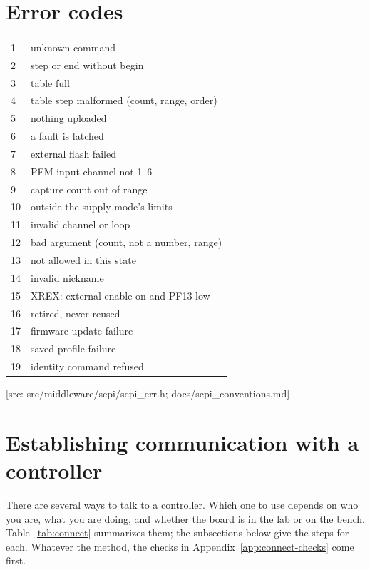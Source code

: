 \documentclass[11pt]{article}
\newcommand{\src}[1]{{\scriptsize\textcolor[gray]{0.45}{[src: #1]}}}
\begin{document}
\section{Error codes}
\label{app:errors}
\begin{center}
\begin{tabular}{L{0.4in} L{4.3in}}
   & unknown command \\ 2 & step or end without begin \\ 3 & table full \\ 4 & table step malformed (count, range, order) \\
  5 & nothing uploaded \\ 6 & a fault is latched \\ 7 & external flash failed \\ 8 & PFM input channel not 1--6 \\
  9 & capture count out of range \\ 10 & outside the supply mode's limits \\ 11 & invalid channel or loop \\
  12 & bad argument (count, not a number, range) \\ 13 & not allowed in this state \\ 14 & invalid nickname \\
  15 & XREX: external enable on and PF13 low \\ 16 & retired, never reused \\ 17 & firmware update failure \\
  18 & saved profile failure \\ 19 & identity command refused \\
  \hline
\end{tabular}
\end{center}
\src{src/middleware/scpi/scpi\_err.h; docs/scpi\_conventions.md}

\section{Establishing communication with a controller}
\label{app:connect}

There are several ways to talk to a controller. Which one to use depends on who you are, what you are doing, and whether the board is in the lab or on the bench. Table~\ref{tab:connect} summarizes them; the subsections below give the steps for each. Whatever the method, the checks in Appendix~\ref{app:connect-checks} come first.
\end{document}
